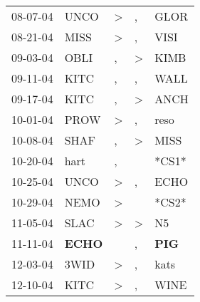\begin{supertabular}{p{0.07\textwidth}p{0.06\textwidth}p{0.02\textwidth}p{0.02\textwidth}p{0.06\textwidth}}
          08-07-04\textsuperscript{} &           UNCO\textsuperscript{} &     \textgreater &                , &           GLOR\textsuperscript{} \\
          08-21-04\textsuperscript{} &           MISS\textsuperscript{} &     \textgreater &                , &           VISI\textsuperscript{} \\
          09-03-04\textsuperscript{} &           OBLI\textsuperscript{} &                , &     \textgreater &           KIMB\textsuperscript{} \\
          09-11-04\textsuperscript{} &           KITC\textsuperscript{} &                , &                , &           WALL\textsuperscript{} \\
          09-17-04\textsuperscript{} &           KITC\textsuperscript{} &                , &     \textgreater &           ANCH\textsuperscript{} \\
          10-01-04\textsuperscript{} &           PROW\textsuperscript{} &     \textgreater &                , &           reso\textsuperscript{} \\
          10-08-04\textsuperscript{} &           SHAF\textsuperscript{} &                , &     \textgreater &           MISS\textsuperscript{} \\
          10-20-04\textsuperscript{} &           hart\textsuperscript{} &                , &                  &                            *CS1* \\
          10-25-04\textsuperscript{} &           UNCO\textsuperscript{} &     \textgreater &                , &           ECHO\textsuperscript{} \\
          10-29-04\textsuperscript{} &           NEMO\textsuperscript{} &     \textgreater &                  &                            *CS2* \\
          11-05-04\textsuperscript{} &           SLAC\textsuperscript{} &     \textgreater &     \textgreater &             N5\textsuperscript{} \\
          11-11-04\textsuperscript{} &  \textbf{ECHO\textsuperscript{}} &                  &                , &   \textbf{PIG\textsuperscript{}} \\
          12-03-04\textsuperscript{} &           3WID\textsuperscript{} &     \textgreater &                , &           kats\textsuperscript{} \\
          12-10-04\textsuperscript{} &           KITC\textsuperscript{} &     \textgreater &                , &           WINE\textsuperscript{} \\

\end{supertabular}
